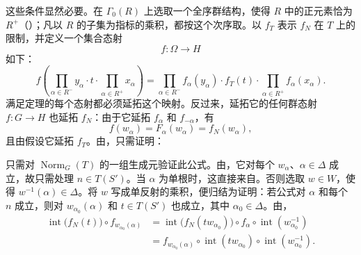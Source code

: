 
这些条件显然必要。在 \(\Gamma_0(R)\) 上选取一个全序群结构，使得 \(R\) 中的正元素恰为 \(R^+\)（）；凡以 \(R\) 的子集为指标的乘积，都按这个次序取。以 \(f_T\) 表示 \(f_N\) 在 \(T\) 上的限制，并定义一个集合态射
\[
  f:\Omega\longrightarrow H
\]
如下：
\[
  f\left(
    \prod_{\alpha\in R^-}y_\alpha\cdot t\cdot
    \prod_{\alpha\in R^+}x_\alpha
  \right)
  =
  \prod_{\alpha\in R^-}f_\alpha(y_\alpha)\cdot f_T(t)\cdot
  \prod_{\alpha\in R^+}f_\alpha(x_\alpha).
\]
满足定理的每个态射都必须延拓这个映射。反过来，延拓它的任何群态射 \(f:G\to H\) 也延拓 \(f_N\)：由于它延拓 \(f_\alpha\) 和 \(f_{-\alpha}\)，有
\[
  f(w_\alpha)=F_\alpha(w_\alpha)=f_N(w_\alpha),
\]
且由假设它延拓 \(f_T\)。由，只需证明：



只需对 \(\operatorname{Norm}_G(T)\) 的一组生成元验证此公式。由，它对每个 \(w_\alpha\)、\(\alpha\in\Delta\) 成立，故只需处理 \(n\in T(S')\)。当 \(\alpha\) 为单根时，这直接来自。否则选取 \(w\in W\)，使得 \(w^{-1}(\alpha)\in\Delta\)。将 \(w\) 写成单反射的乘积，便归结为证明：若公式对 \(\alpha\) 和每个 \(n\) 成立，则对 \(w_{\alpha_0}(\alpha)\) 和 \(t\in T(S')\) 也成立，其中 \(\alpha_0\in\Delta\)。由，
\[
\begin{aligned}
  \operatorname{int}\bigl(f_N(t)\bigr)\circ f_{w_{\alpha_0}(\alpha)}
   &=
  \operatorname{int}\bigl(f_N(tw_{\alpha_0})\bigr)\circ
  f_\alpha\circ\operatorname{int}(w_{\alpha_0}^{-1})\\
   &=
  f_{w_{\alpha_0}(\alpha)}\circ\operatorname{int}(tw_{\alpha_0})
    \circ\operatorname{int}(w_{\alpha_0}^{-1}).
\end{aligned}
\]

